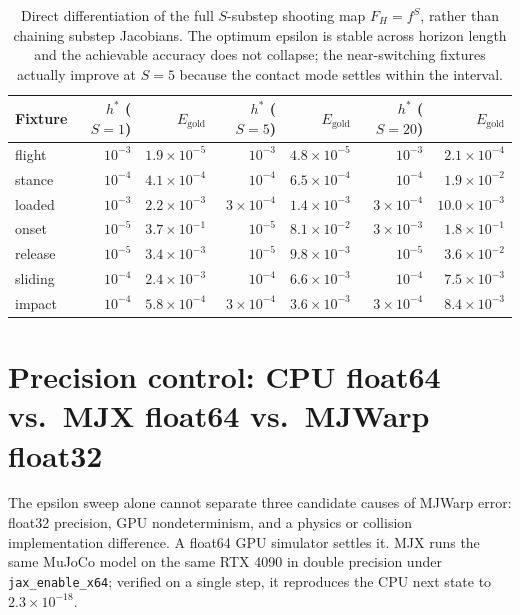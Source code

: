 \documentclass[11pt,a4paper]{article}
\newcommand{\code}[1]{\texttt{\small #1}}
\begin{document}
\begin{table}[htbp]
\centering
\footnotesize
\caption{Direct differentiation of the full $S$-substep shooting map $F_H = f^S$, rather than chaining substep Jacobians. The optimum epsilon is stable across horizon length and the achievable accuracy does not collapse; the near-switching fixtures actually improve at $S=5$ because the contact mode settles within the interval.}
\label{tab:substep}
\begin{tabular}{lrrrrrr}
\toprule
\textbf{Fixture} & $h^\ast$ ($S{=}1$) & $E_{\mathrm{gold}}$ & $h^\ast$ ($S{=}5$) & $E_{\mathrm{gold}}$ & $h^\ast$ ($S{=}20$) & $E_{\mathrm{gold}}$ \\
\midrule
flight & $10^{-3}$ & $1.9\times10^{-5}$ & $10^{-3}$ & $4.8\times10^{-5}$ & $10^{-3}$ & $2.1\times10^{-4}$ \\
stance & $10^{-4}$ & $4.1\times10^{-4}$ & $10^{-4}$ & $6.5\times10^{-4}$ & $10^{-4}$ & $1.9\times10^{-2}$ \\
loaded & $10^{-3}$ & $2.2\times10^{-3}$ & $3\times10^{-4}$ & $1.4\times10^{-3}$ & $3\times10^{-4}$ & $10.0\times10^{-3}$ \\
onset & $10^{-5}$ & $3.7\times10^{-1}$ & $10^{-5}$ & $8.1\times10^{-2}$ & $3\times10^{-3}$ & $1.8\times10^{-1}$ \\
release & $10^{-5}$ & $3.4\times10^{-3}$ & $10^{-5}$ & $9.8\times10^{-3}$ & $10^{-5}$ & $3.6\times10^{-2}$ \\
sliding & $10^{-4}$ & $2.4\times10^{-3}$ & $10^{-4}$ & $6.6\times10^{-3}$ & $10^{-4}$ & $7.5\times10^{-3}$ \\
impact & $10^{-4}$ & $5.8\times10^{-4}$ & $3\times10^{-4}$ & $3.6\times10^{-3}$ & $3\times10^{-4}$ & $8.4\times10^{-3}$ \\
\bottomrule
\end{tabular}
\end{table}

\section{Precision control: CPU float64 vs.\ MJX float64 vs.\ MJWarp float32}

The epsilon sweep alone cannot separate three candidate causes of MJWarp error:
float32 precision, GPU nondeterminism, and a physics or collision implementation difference.
A float64 GPU simulator settles it. MJX runs the same MuJoCo model on the same RTX 4090 in
double precision under \code{jax\_enable\_x64}; verified on a single step, it reproduces the
CPU next state to $2.3\times10^{-18}$.
\end{document}

